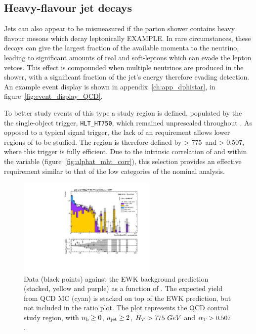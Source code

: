 \subsection{Heavy-flavour jet decays}

Jets can also appear to be mismeasured if the parton
shower contains heavy flavour mesons which decay leptonically EXAMPLE. In rare
circumstances, these decays can give the largest fraction of the available
momenta to the neutrino, leading to significant amounts of real \met and
soft-leptons which can evade the lepton vetoes.
This effect is compounded when multiple neutrinos are produced in the shower,
with a significant fraction of the jet's energy therefore evading detection. An
example event display is shown in appendix~\ref{ch:app_dphistar}, in
figure~\ref{fig:event_display_QCD}.

To better study events of this type a study region is defined, populated by the
the single-object \HT trigger, \verb!HLT_HT750!, which remained unprescaled
throughout \runone. As opposed to a typical signal trigger, the lack of an
\alphat requirement allows lower regions of \alphat to be studied. The region is
therefore defined by \HT > 775~\gev and \alphat > 0.507, where this trigger is
fully efficient. Due to the intrinsic correlation of \HT and \mht within the
\alphat variable (figure~\ref{fig:alphat_mht_corr}), this selection provides
an effective \mht requirement similar to that of the low \HT categories of the
nominal analysis.

\begin{figure}[t]
  \centering
  \includegraphics[width=0.6\textwidth]
  {Figs/datapred/qcd_study_region/ge2j_ge0b_775_upwards/Prediction_ComMinBiasDPhi_acceptedJets_all_775_upwards_QCD}
  \caption{Data (black points) against the EWK background prediction 
  (stacked, yellow and purple) as a function of \mindphistar. The expected yield
  from QCD MC (cyan) is stacked on top of the EWK prediction, but not included
  in the ratio plot. The plot represents
  the QCD control study region, with $n_{\text{b}} \geq 0$, $n_{\text{jet}} \geq 2$, $H_T > 775
 ~GeV$ and $\alpha_{\text{T}} > 0.507$.}
  \label{fig:qcd_region_pred_dphistar_incl}
\end{figure}

